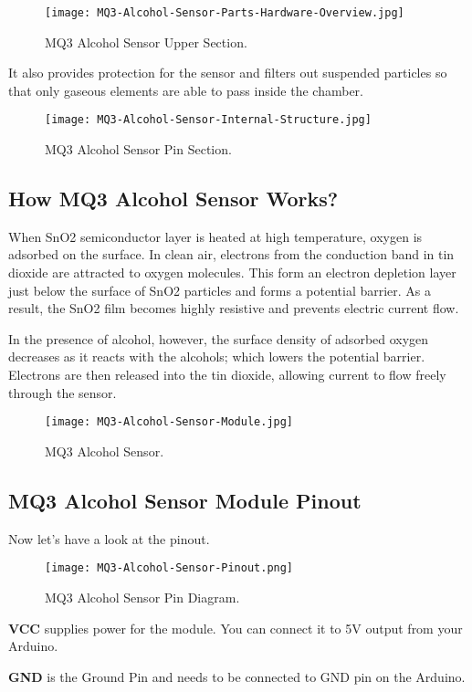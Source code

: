 \begin{figure}[h]
	\centering
	\texttt{[image: MQ3-Alcohol-Sensor-Parts-Hardware-Overview.jpg]}
	\caption{MQ3 Alcohol Sensor Upper Section.}
\end{figure}
It also provides protection for the sensor and filters out suspended particles so that only gaseous elements are able to pass inside the chamber.
\pagebreak
\begin{figure}[h]
	\centering
	\texttt{[image: MQ3-Alcohol-Sensor-Internal-Structure.jpg]}
	\caption{MQ3 Alcohol Sensor Pin Section.}
\end{figure}

\subsection{How MQ3 Alcohol Sensor Works?}
When SnO2 semiconductor layer is heated at high temperature, oxygen is adsorbed on the surface. In clean air, electrons from the conduction band in tin dioxide are attracted to oxygen molecules. This form an electron depletion layer just below the surface of SnO2 particles and forms a potential barrier. As a result, the SnO2 film becomes highly resistive and prevents electric current flow.

In the presence of alcohol, however, the surface density of adsorbed oxygen decreases as it reacts with the alcohols; which lowers the potential barrier. Electrons are then released into the tin dioxide, allowing current to flow freely through the sensor.

\begin{figure}[h]
	\centering
	\texttt{[image: MQ3-Alcohol-Sensor-Module.jpg]}
	\caption{MQ3 Alcohol Sensor.}
\end{figure}
\subsection{MQ3 Alcohol Sensor Module Pinout}
Now let’s have a look at the pinout.
\begin{figure}[h]
	\centering
	\texttt{[image: MQ3-Alcohol-Sensor-Pinout.png]}
	\caption{MQ3 Alcohol Sensor Pin Diagram.}
\end{figure}

\textbf{VCC} supplies power for the module. You can connect it to 5V output from your Arduino.

\textbf{GND }is the Ground Pin and needs to be connected to GND pin on the Arduino.



